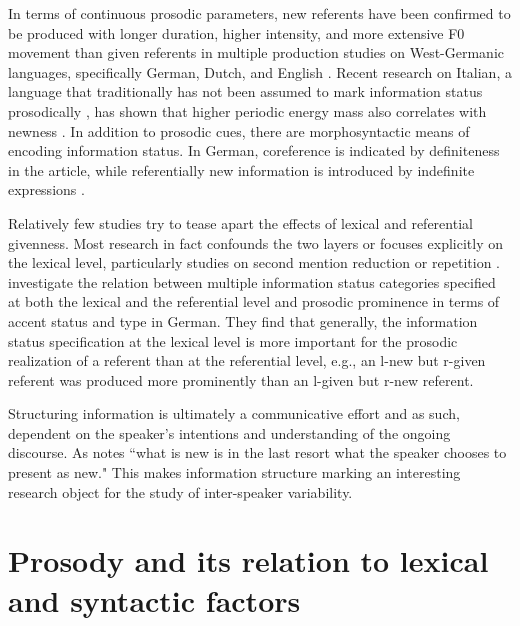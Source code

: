 In terms of continuous prosodic parameters, new referents have been confirmed to be produced with longer duration, higher intensity, and more extensive F0 movement than given referents in multiple production studies on West-Germanic languages, specifically German, Dutch, and English \citep[e.g.,][]{swertsProsodicMarkingInformation2002, feryPitchAccentScaling2008, bakerVariabilityWordDuration2009, baumannCoreferenceLexicalGivenness2013, chodroffPhonologicalPhoneticEncoding2019}. Recent research on Italian, a language that traditionally has not been assumed to mark information status prosodically \citep[e.g.,][]{swertsProsodicMarkingInformation2002}, has shown that higher periodic energy mass also correlates with newness \citep{sbrannaProsodicMarkingInformation2023}. In addition to prosodic cues, there are morphosyntactic means of encoding information status. In German, coreference is indicated by definiteness in the article, while referentially new information is introduced by indefinite expressions \citep{baumannReferentialLexicalGivenness2012}.

Relatively few studies try to tease apart the effects of lexical and referential givenness. Most research in fact confounds the two layers or focuses explicitly on the lexical level, particularly studies on second mention reduction or repetition \citep{fowlerTalkersSignalingNew1987, bakerVariabilityWordDuration2009}. \citet{baumannCoreferenceLexicalGivenness2013} investigate the relation between multiple information status categories specified at both the lexical and the referential level and prosodic prominence in terms of accent status and type in German. They find that generally, the information status specification at the lexical level is more important for the prosodic realization of a referent than at the referential level, e.g., an l-new but r-given referent was produced more prominently than an l-given but r-new referent.

Structuring information is ultimately a communicative effort and as such, dependent on the speaker's intentions and understanding of the ongoing discourse. As \citet[211]{hallidayNotesTransitivityTheme1967} notes ``what is new is in the last resort what the speaker chooses to present as new." This makes information structure marking an interesting research object for the study of inter-speaker variability.

\section{Prosody and its relation to lexical and syntactic factors} \label{section: lexical and syntactic}

